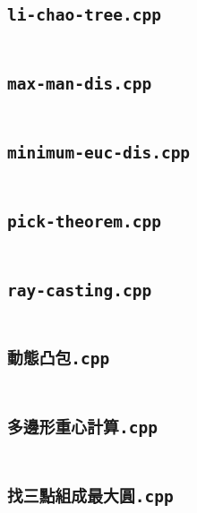 \subsection*{\texttt{li-chao-tree.cpp}} \label{sec:4_4_Geometry_file6}
\inputminted[fontsize=\footnotesize, linenos, breaklines]{cpp}{./4\ Geometry/li-chao-tree.cpp}

\subsection*{\texttt{max-man-dis.cpp}} \label{sec:4_4_Geometry_file7}
\inputminted[fontsize=\footnotesize, linenos, breaklines]{cpp}{./4\ Geometry/max-man-dis.cpp}

\subsection*{\texttt{minimum-euc-dis.cpp}} \label{sec:4_4_Geometry_file8}
\inputminted[fontsize=\footnotesize, linenos, breaklines]{cpp}{./4\ Geometry/minimum-euc-dis.cpp}

\subsection*{\texttt{pick-theorem.cpp}} \label{sec:4_4_Geometry_file9}
\inputminted[fontsize=\footnotesize, linenos, breaklines]{cpp}{./4\ Geometry/pick-theorem.cpp}

\subsection*{\texttt{ray-casting.cpp}} \label{sec:4_4_Geometry_file10}
\inputminted[fontsize=\footnotesize, linenos, breaklines]{cpp}{./4\ Geometry/ray-casting.cpp}

\subsection*{\texttt{動態凸包.cpp}} \label{sec:4_4_Geometry_file11}
\inputminted[fontsize=\footnotesize, linenos, breaklines]{cpp}{./4\ Geometry/動態凸包.cpp}

\subsection*{\texttt{多邊形重心計算.cpp}} \label{sec:4_4_Geometry_file12}
\inputminted[fontsize=\footnotesize, linenos, breaklines]{cpp}{./4\ Geometry/多邊形重心計算.cpp}

\subsection*{\texttt{找三點組成最大圓.cpp}} \label{sec:4_4_Geometry_file13}
\inputminted[fontsize=\footnotesize, linenos, breaklines]{cpp}{./4\ Geometry/找三點組成最大圓.cpp}

